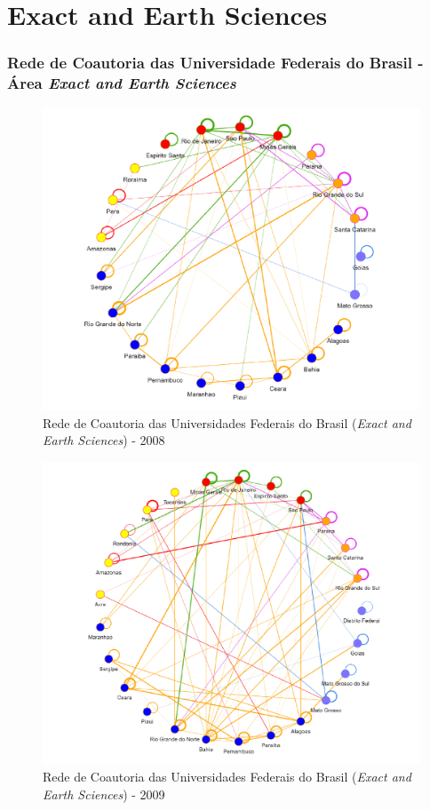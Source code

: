 
\section{\textbf{Exact and Earth Sciences}}

\subsubsection{Rede de Coautoria das Universidade Federais do Brasil - Área \textit{Exact and Earth Sciences}}


\begin{figure}[H]
	\centering
	\includegraphics[width=\linewidth]{Imagens/rede-exact-br-2008.pdf}
	\caption{Rede de Coautoria das Universidades Federais do Brasil (\textit{Exact and Earth Sciences}) - 2008}
	\label{Rede de Coautoria - UF EXACT BR 2008}
\end{figure}

\begin{figure}[H]
	\centering
	\includegraphics[width=\linewidth]{Imagens/rede-exact-br-2009.pdf}
	\caption{Rede de Coautoria das Universidades Federais do Brasil (\textit{Exact and Earth Sciences}) - 2009}
	\label{Rede de Coautoria - UF EXACT BR 2009}
\end{figure}

